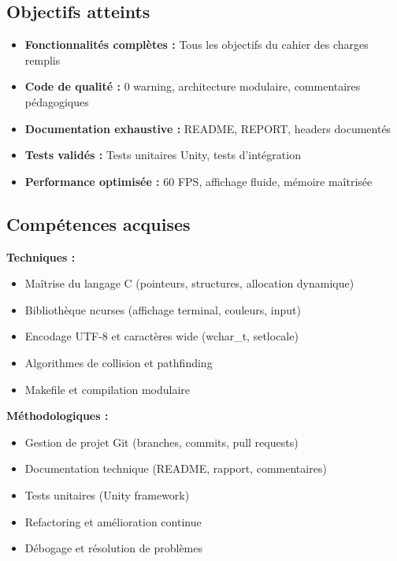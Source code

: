 \documentclass[12pt,a4paper]{article}
\begin{document}
\subsection{Objectifs atteints}

\begin{itemize}
    \item[$\checkmark$] \textbf{Fonctionnalités complètes :} Tous les objectifs du cahier des charges remplis
    \item[$\checkmark$] \textbf{Code de qualité :} 0 warning, architecture modulaire, commentaires pédagogiques
    \item[$\checkmark$] \textbf{Documentation exhaustive :} README, REPORT, headers documentés
    \item[$\checkmark$] \textbf{Tests validés :} Tests unitaires Unity, tests d'intégration
    \item[$\checkmark$] \textbf{Performance optimisée :} 60 FPS, affichage fluide, mémoire maîtrisée
\end{itemize}

\subsection{Compétences acquises}

\textbf{Techniques :}
\begin{itemize}
    \item Maîtrise du langage C (pointeurs, structures, allocation dynamique)
    \item Bibliothèque ncurses (affichage terminal, couleurs, input)
    \item Encodage UTF-8 et caractères wide (wchar\_t, setlocale)
    \item Algorithmes de collision et pathfinding
    \item Makefile et compilation modulaire
\end{itemize}

\textbf{Méthodologiques :}
\begin{itemize}
    \item Gestion de projet Git (branches, commits, pull requests)
    \item Documentation technique (README, rapport, commentaires)
    \item Tests unitaires (Unity framework)
    \item Refactoring et amélioration continue
    \item Débogage et résolution de problèmes
\end{itemize}
\end{document}
